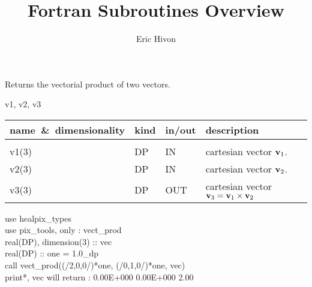 
\sloppy


\title{\healpix Fortran Subroutines Overview}
 \section[vect\_prod]{ }
\label{sub:vect_prod}
\author{Eric Hivon}

\begin{facility}
{Returns the vectorial product of two vectors.} 
{\modPixTools}
\end{facility}

\begin{f90format}
{v1, v2, v3}
\end{f90format}

\begin{arguments}
{
\begin{tabular}{p{0.3\hsize} p{0.05\hsize} p{0.1\hsize} p{0.45\hsize}} \hline 
\textbf{name~\&~dimensionality} & \textbf{kind} & \textbf{in/out} & \textbf{description} \\ \hline
                   &   &   &                           \\ %
v1(3) & DP & IN & cartesian vector ${\bf v}_1$. \\
v2(3) & DP & IN & cartesian vector ${\bf v}_2$. \\
v3(3) & DP & OUT & cartesian vector ${\bf v}_3 = {\bf v}_1 \times {\bf v}_2$ \\
\end{tabular}
}
\end{arguments}

\begin{example}
{
use healpix\_types \\
use pix\_tools,    only : vect\_prod \\
real(DP), dimension(3) :: vec\\
real(DP) :: one = 1.0\_dp \\
call vect\_prod((/2,0,0/)*one, (/0,1,0/)*one, vec)  \\
print*, vec
}
{
will return : 0.00E+000  0.00E+000   2.00
}
\end{example}

